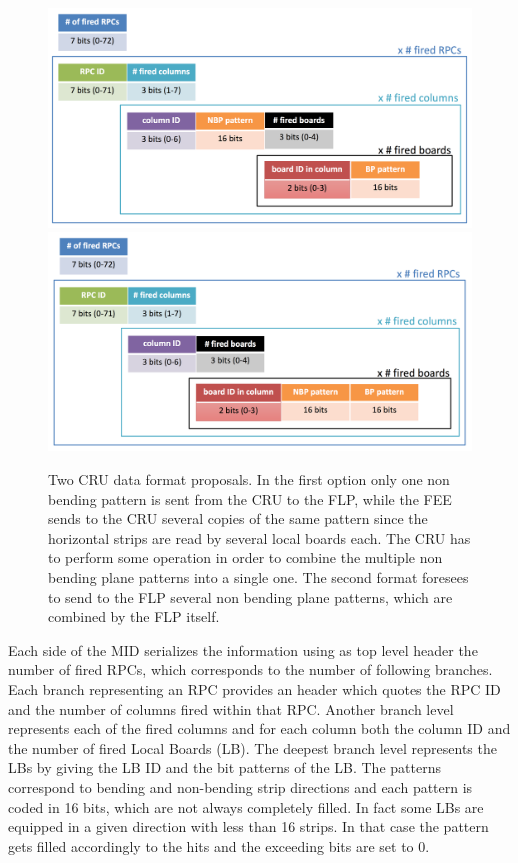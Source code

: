 \begin{figure}[]
\begin{center}
\includegraphics[width=0.99\linewidth]{Chapters/O2/Figs/MID_format_2.png}
\includegraphics[width=0.99\linewidth]{Chapters/O2/Figs/MID_format_1.png}
\caption{Two CRU data format proposals. 
In the first option only one non bending pattern is sent from the CRU to the FLP, while the FEE sends to the CRU several copies of the same pattern since the horizontal strips are read by several local boards each. The CRU has to perform some operation in order to combine the multiple non bending plane patterns into a single one.
The second format foresees to send to the FLP several non bending plane patterns, which are combined by the FLP itself.}
\label{fig:MID_CRU_DF}
\end{center}
\end{figure}

Each side of the MID serializes the information using as top level header the number of fired RPCs, which corresponds to the number of following branches.
Each branch representing an RPC provides an header which quotes the RPC ID and the number of columns fired within that RPC.
Another branch level represents each of the fired columns and for each column both the column ID and the number of fired Local Boards (LB).
The deepest branch level represents the LBs by giving the LB ID and the bit patterns of the LB.
The patterns correspond to bending and non-bending strip directions and each pattern is coded in 16 bits, which are not always completely filled.
In fact some LBs are equipped in a given direction with less than 16 strips.
In that case the pattern gets filled accordingly to the hits and the exceeding bits are set to 0.

